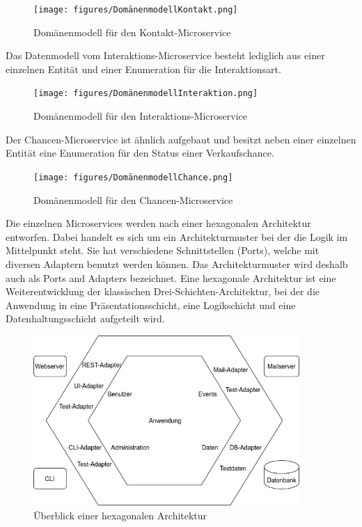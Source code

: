 \begin{figure}[H] 
    \centering
    \texttt{[image: figures/DomänenmodellKontakt.png]}
    \caption{Domänenmodell für den Kontakt-Microservice}
\end{figure} 

Das Datenmodell vom Interaktions-Microservice besteht lediglich aus einer einzelnen Entität und einer Enumeration für die Interaktionsart.

\begin{figure}[H] 
    \centering
    \texttt{[image: figures/DomänenmodellInteraktion.png]}
    \caption{Domänenmodell für den Interaktions-Microservice}
\end{figure}

Der Chancen-Microservice ist ähnlich aufgebaut und besitzt neben einer einzelnen Entität eine Enumeration für den Status einer Verkaufschance.

\begin{figure}[H] 
    \centering
    \texttt{[image: figures/DomänenmodellChance.png]}
    \caption{Domänenmodell für den Chancen-Microservice}
\end{figure}

Die einzelnen Microservices werden nach einer hexagonalen Architektur entworfen. Dabei handelt es sich um ein Architekturmuster bei der die Logik im Mittelpunkt steht. Sie hat verschiedene Schnittstellen (Ports), welche mit diversen Adaptern benutzt werden können. Das Architekturmuster wird deshalb auch als Ports and Adapters bezeichnet. Eine hexagonale Architektur ist eine Weiterentwicklung der klassischen Drei-Schichten-Architektur, bei der die Anwendung in eine Präsentationsschicht, eine Logikschicht und eine Datenhaltungsschicht aufgeteilt wird.

\begin{figure}[H] 
    \centering
    \includegraphics[width=0.9\textwidth]{figures/HexagonalDesignConcept.png}
    \caption{Überblick einer hexagonalen Architektur \parencite[vgl.][S. 204]{wolffMicroservices2018}}
\end{figure}

